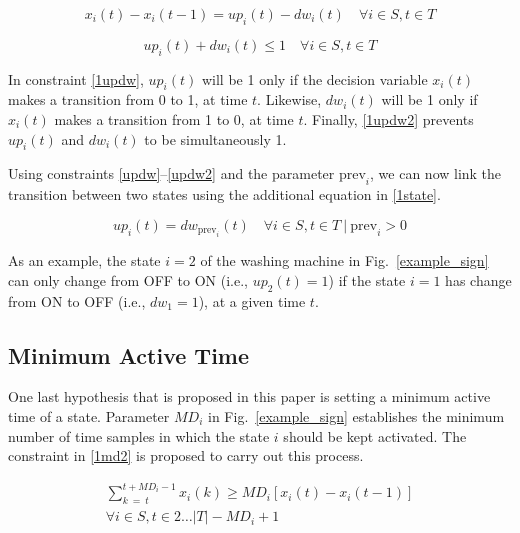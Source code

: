 \begin{equation} \label{1updw}
    x_i(t) - x_i(t-1) = up_i(t) - dw_i(t) \quad \forall i \in S, t \in T
\end{equation}


\begin{equation} \label{1updw2}
    up_i(t) + dw_i(t) \leq 1 \quad \forall i \in S, t \in T
\end{equation}

In constraint \eqref{1updw}, $up_i(t)$ will be 1 only if the decision variable $x_i(t)$ makes a transition from 0 to 1, at time $t$. Likewise, $dw_i(t)$ will be 1 only if $x_i(t)$ makes a transition from 1 to 0, at time $t$. Finally, \eqref{1updw2} prevents $up_i(t)$ and $dw_i(t)$ to be simultaneously 1.


Using constraints \eqref{updw}--\eqref{updw2} and the parameter $\text{prev}_i$, we can now link the transition between two states using the additional equation in \eqref{1state}.

\begin{equation} \label{1state}
    up_i(t) = dw_{\text{prev}_i}(t) \quad \forall i \in S, t \in T \ | \ \text{prev}_i>0
\end{equation}

As an example, the state $i = 2$ of the washing machine in Fig.~\ref{example_sign} can only change from OFF to ON (i.e., $up_2(t) = 1$) if the state $i = 1$ has change from ON to OFF (i.e., $dw_1 = 1$), at a given time $t$.

\subsection{Minimum Active Time}

One last hypothesis that is proposed in this paper is setting a minimum active time of a state. Parameter $MD_i$ in Fig.~\ref{example_sign} establishes the minimum number of time samples in which the state $i$ should be kept activated. The constraint in \eqref{1md2} is proposed to carry out this process. 

\begin{multline}\label{1md2}
    \sum_{k\ =\ t}^{t+MD_i-1} x_i(k) \geq MD_i \left[ x_i(t) - x_i(t-1) \right] \\
    \forall i \in S, t \in 2 \hdots |T| - {MD}_i + 1
\end{multline}

